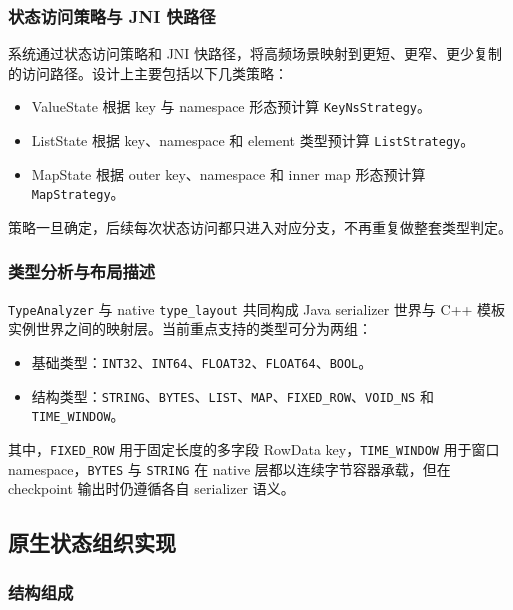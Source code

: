 \documentclass[a4paper,11pt]{article}
\begin{document}
\subsubsection{状态访问策略与 JNI 快路径}

系统通过状态访问策略和 JNI 快路径，将高频场景映射到更短、更窄、更少复制的访问路径。设计上主要包括以下几类策略：

\begin{itemize}
  \item ValueState 根据 key 与 namespace 形态预计算 \texttt{KeyNsStrategy}。
  \item ListState 根据 key、namespace 和 element 类型预计算 \texttt{ListStrategy}。
  \item MapState 根据 outer key、namespace 和 inner map 形态预计算 \texttt{MapStrategy}。
\end{itemize}

策略一旦确定，后续每次状态访问都只进入对应分支，不再重复做整套类型判定。

\subsubsection{类型分析与布局描述}

\texttt{TypeAnalyzer} 与 native \texttt{type\_layout} 共同构成 Java serializer 世界与 C++ 模板实例世界之间的映射层。当前重点支持的类型可分为两组：

\begin{itemize}
  \item 基础类型：\texttt{INT32}、\texttt{INT64}、\texttt{FLOAT32}、\texttt{FLOAT64}、\texttt{BOOL}。
  \item 结构类型：\texttt{STRING}、\texttt{BYTES}、\texttt{LIST}、\texttt{MAP}、\texttt{FIXED\_ROW}、\texttt{VOID\_NS} 和 \texttt{TIME\_WINDOW}。
\end{itemize}

其中，\texttt{FIXED\_ROW} 用于固定长度的多字段 RowData key，\texttt{TIME\_WINDOW} 用于窗口 namespace，\texttt{BYTES} 与 \texttt{STRING} 在 native 层都以连续字节容器承载，但在 checkpoint 输出时仍遵循各自 serializer 语义。

\subsection{原生状态组织实现}

\subsubsection{结构组成}
\end{document}
